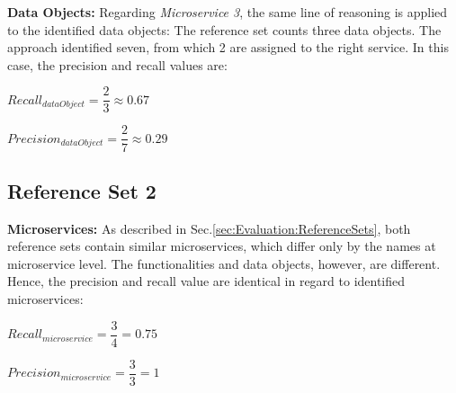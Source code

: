 \noindent
\textbf{Data Objects:} Regarding \textit{Microservice 3}, the same line of reasoning is applied to the identified data objects: The reference set counts three data objects. The approach identified seven, from which 2 are assigned to the right service. In this case, the precision and recall values are:


\hspace{1cm}
\noindent
\begin{minipage}{.4\linewidth}
	\vspace{0.5cm}
	\flushleft
	
	
	$Recall_{dataObject}=\dfrac{2}{3} \approx 0.67  $
	\vspace{0.5cm}
	
\end{minipage}%
\begin{minipage}{.5\linewidth}
	\vspace{0.5cm}
	\flushleft
	
	
	$Precision_{dataObject}=\dfrac{2}{7} \approx 0.29  $
	\vspace{0.5cm}
	
\end{minipage}





\subsection{Reference Set 2}



\textbf{Microservices:} As described in Sec.\ref{sec:Evaluation:ReferenceSets}, both reference sets contain similar microservices, which differ only by the names at microservice level. The functionalities and data objects, however, are different. Hence, the precision and recall value are identical in regard to identified microservices:

\hspace{1cm}
\noindent
\begin{minipage}{.4\linewidth}
	\vspace{0.5cm}
	\flushleft
	
	
	$Recall_{microservice}=\dfrac{3}{4} = 0.75  $
	\vspace{0.5cm}
	
\end{minipage}%
\begin{minipage}{.5\linewidth}
	\vspace{0.5cm}
	\flushleft
	
	
	$Precision_{microservice}=\dfrac{3}{3} = 1  $
	\vspace{0.5cm}
	
\end{minipage}

